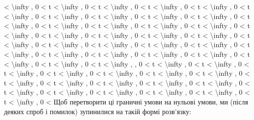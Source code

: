 \documentclass[
]{article}
\begin{document}
{\textless{} \textbackslash infty , 0 \textless{} t \textless{}
\textbackslash infty , 0 \textless{} t \textless{} \textbackslash infty
, 0 \textless{} t \textless{} \textbackslash infty , 0 \textless{} t
\textless{} \textbackslash infty , 0 \textless{} t \textless{}
\textbackslash infty , 0 \textless{} t \textless{} \textbackslash infty
, 0 \textless{} t \textless{} \textbackslash infty , 0 \textless{} t
\textless{} \textbackslash infty , 0 \textless{} t \textless{}
\textbackslash infty , 0 \textless{} t \textless{} \textbackslash infty
, 0 \textless{} t \textless{} \textbackslash infty , 0 \textless{} t
\textless{} \textbackslash infty , 0 \textless{} t \textless{}
\textbackslash infty , 0 \textless{} t \textless{} \textbackslash infty
, 0 \textless{} t \textless{} \textbackslash infty , 0 \textless{} t
\textless{} \textbackslash infty , 0 \textless{} t \textless{}
\textbackslash infty , 0 \textless{} t \textless{} \textbackslash infty
, 0 \textless{} t \textless{} \textbackslash infty , 0 \textless{} t
\textless{} \textbackslash infty , 0 \textless{} t \textless{}
\textbackslash infty , 0 \textless{} t \textless{} \textbackslash infty
, 0 \textless{} t \textless{} \textbackslash infty , 0 \textless{} t
\textless{} \textbackslash infty , 0 \textless{} t \textless{}
\textbackslash infty , 0 \textless{} t \textless{} \textbackslash infty
, 0 \textless{} t \textless{} \textbackslash infty , 0 \textless{} t
\textless{} \textbackslash infty , 0 \textless{} t \textless{}
\textbackslash infty , 0 \textless{} t \textless{} \textbackslash infty
, 0 \textless{} t \textless{} \textbackslash infty , 0 \textless{} t
\textless{} \textbackslash infty , , 0 \textless{} t \textless{}
\textbackslash infty , 0 \textless{} t \textless{} \textbackslash infty
, 0 \textless{} t \textless{} \textbackslash infty , 0 \textless{} t
\textless{} \textbackslash infty , 0 \textless{} t \textless{}
\textbackslash infty , 0 \textless{} t \textless{} \textbackslash infty
, 0 \textless{} t \textless{} \textbackslash infty , 0 \textless{} t
\textless{} \textbackslash infty , 0 \textless{} t \textless{}
\textbackslash infty , 0 \textless{} t \textless{} \textbackslash infty
, 0 \textless{} t \textless{} \textbackslash infty , 0 \textless{} t
\textless{} \textbackslash infty , 0 \textless{} t \textless{}
\textbackslash infty , 0 \textless{} t \textless{} \textbackslash infty
, 0 \textless{} t \textless{} \textbackslash infty , 0 \textless{} t
\textless{} \textbackslash infty , 0 \textless{} t \textless{}
\textbackslash infty , 0 \textless{} t \textless{} \textbackslash infty
, 0 \textless{} Щоб перетворити ці граничні умови на нульові умови, ми
(після деяких спроб і помилок) зупинилися на такій формі розв'язку:

}
\end{document}
